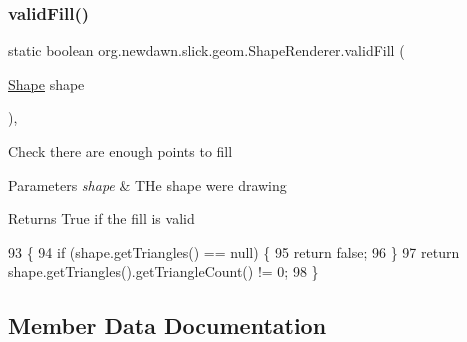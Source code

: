 \mbox{\label{classorg_1_1newdawn_1_1slick_1_1geom_1_1_shape_renderer_a1e630761b7f3631a05e0eb8e9d9ce091}} 
\subsubsection{\texorpdfstring{valid\+Fill()}{validFill()}}
{\footnotesize\ttfamily static boolean org.\+newdawn.\+slick.\+geom.\+Shape\+Renderer.\+valid\+Fill (\begin{DoxyParamCaption}\item[{\mbox{\hyperlink{classorg_1_1newdawn_1_1slick_1_1geom_1_1_shape}{Shape}}}]{shape }\end{DoxyParamCaption})\hspace{0.3cm}{\ttfamily [inline]}, {\ttfamily [static]}}

Check there are enough points to fill


\begin{DoxyParams}{Parameters}
{\em shape} & T\+He shape we\textquotesingle{}re drawing \\
\hline
\end{DoxyParams}
\begin{DoxyReturn}{Returns}
True if the fill is valid 
\end{DoxyReturn}

\begin{DoxyCode}
93                                                  \{
94         \textcolor{keywordflow}{if} (shape.getTriangles() == null) \{
95             \textcolor{keywordflow}{return} \textcolor{keyword}{false};
96         \}
97         \textcolor{keywordflow}{return} shape.getTriangles().getTriangleCount() != 0;
98     \}
\end{DoxyCode}


\subsection{Member Data Documentation}
\mbox{\label{classorg_1_1newdawn_1_1slick_1_1geom_1_1_shape_renderer_a6116897ec2e7979b9ca9d406a4dfd566}} 
